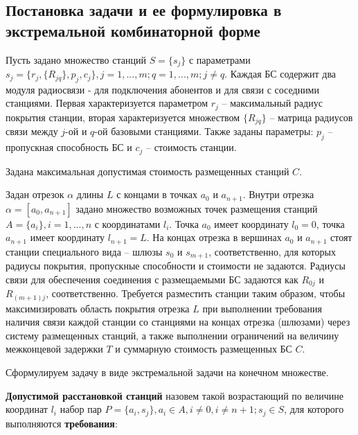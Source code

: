 \subsection{Постановка задачи и ее формулировка в экстремальной комбинаторной форме}

Пусть задано множество станций $S=\{s_j\}$ с параметрами $s_j=\{r_j,\{R_{jq} \},p_j, c_j \},j=1,...,m;q=1,...,m;j \neq q $. Каждая БС содержит два модуля радиосвязи - для подключения абонентов и для связи с соседними станциями. Первая характеризуется параметром $r_j$ -- максимальный радиус покрытия станции, вторая характеризуется множеством $\{R_{jq} \}$ -- матрица радиусов связи между $j$-ой и $q$-ой базовыми станциями. Также заданы параметры: $p_j$ -- пропускная способность БС и $c_j$ -- стоимость станции.

Задана максимальная допустимая стоимость размещенных станций $C$. 


Задан отрезок $\alpha$ длины $L$ с концами в точках $a_0$ и $a_{n+1}$. Внутри отрезка $\alpha = [a_0, a_{n+1}]$ задано множество возможных точек размещения станций $A=\{a_i \},i=1,...,n$ с координатами $l_i$. Точка $a_0$ имеет координату $l_0=0$, точка $a_{n+1}$ имеет координату $l_{n+1}=L$. На концах отрезка в вершинах $a_0$ и $a_{n+1}$ стоят станции специального вида -- шлюзы $s_0$ и $s_{m+1}$, соответственно, для которых радиусы покрытия, пропускные способности и стоимости не задаются. Радиусы связи для обеспечения соединения с размещаемыми БС задаются как $R_{0j}$ и $R_{(m+1)j}$, соответственно.
Требуется разместить станции таким образом, чтобы максимизировать область покрытия отрезка $L$ при выполнении требования наличия связи каждой станции со станциями на концах отрезка (шлюзами) через систему размещенных станций, а также выполнении ограничений на величину межконцевой задержки $T$ и суммарную стоимость размещенных БС $C$.

Сформулируем задачу в виде экстремальной задачи на конечном множестве.

\textbf{Допустимой расстановкой станций} назовем такой возрастающий по величине координат $l_i$  набор пар $P = \{a_i, s_j\},a_i \in A,i \neq 0,i \neq n+1;s_j \in S$, для которого выполняются \textbf{требования}:

